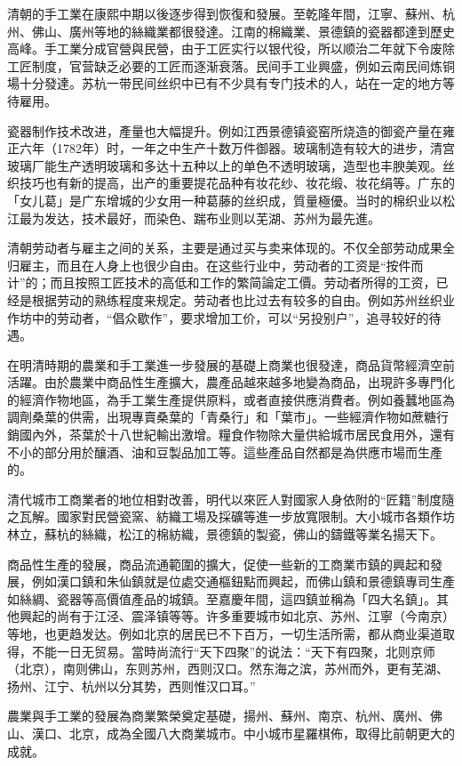 清朝的手工業在康熙中期以後逐步得到恢復和發展。至乾隆年間，江寧、蘇州、杭州、佛山、廣州等地的絲織業都很發達。江南的棉織業、景德鎮的瓷器都達到歷史高峰。手工業分成官營與民營，由于工匠实行以银代役，所以顺治二年就下令废除工匠制度，官营缺乏必要的工匠而逐渐衰落。民间手工业興盛，例如云南民间炼铜場十分發達。苏杭一带民间丝织中已有不少具有专门技术的人，站在一定的地方等待雇用。

瓷器制作技术改进，產量也大幅提升。例如江西景德镇瓷窑所烧造的御瓷产量在雍正六年（1782年）时，一年之中生产十数万件御器。玻璃制造有较大的进步，清宫玻璃厂能生产透明玻璃和多达十五种以上的单色不透明玻璃，造型也丰腴美观。丝织技巧也有新的提高，出产的重要提花品种有妆花纱、妆花缎、妆花绢等。广东的「女儿葛」是广东增城的少女用一种葛藤的丝织成，質量極優。当时的棉织业以松江最为发达，技术最好，而染色、踹布业则以芜湖、苏州为最先進。

清朝劳动者与雇主之间的关系，主要是通过买与卖来体现的。不仅全部劳动成果全归雇主，而且在人身上也很少自由。在这些行业中，劳动者的工资是“按件而计”的；而且按照工匠技术的高低和工作的繁简論定工價。劳动者所得的工资，已经是根据劳动的熟练程度来规定。劳动者也比过去有较多的自由。例如苏州丝织业作坊中的劳动者，“倡众歇作”，要求增加工价，可以“另投别户”，追寻较好的待遇。

在明清時期的農業和手工業進一步發展的基礎上商業也很發達，商品貨幣經濟空前活躍。由於農業中商品性生產擴大，農產品越來越多地變為商品，出現許多專門化的經濟作物地區，為手工業生產提供原料，或者直接供應消費者。例如養蠶地區為調劑桑葉的供需，出現專賣桑葉的「青桑行」和「葉市」。一些經濟作物如蔗糖行銷國內外，茶葉於十八世紀輸出激增。糧食作物除大量供給城市居民食用外，還有不小的部分用於釀酒、油和豆製品加工等。這些產品自然都是為供應市場而生產的。

清代城市工商業者的地位相對改善，明代以來匠人對國家人身依附的“匠籍”制度隨之瓦解。國家對民營瓷窯、紡織工場及採礦等進一步放寬限制。大小城市各類作坊林立，蘇杭的絲織，松江的棉紡織，景德鎮的製瓷，佛山的鑄鐵等業名揚天下。

商品性生產的發展，商品流通範圍的擴大，促使一些新的工商業市鎮的興起和發展，例如漢口鎮和朱仙鎮就是位處交通樞鈕點而興起，而佛山鎮和景德鎮專司生產如絲綢、瓷器等高價值產品的城鎮。至嘉慶年間，這四鎮並稱為「四大名鎮」。其他興起的尚有于江泾、震泽镇等等。许多重要城市如北京、苏州、江寧（今南京）等地，也更趋发达。例如北京的居民已不下百万，一切生活所需，都从商业渠道取得，不能一日无贸易。當時尚流行“天下四聚”的说法：“天下有四聚，北则京师（北京），南则佛山，东则苏州，西则汉口。然东海之滨，苏州而外，更有芜湖、扬州、江宁、杭州以分其势，西则惟汉口耳。”

農業與手工業的發展為商業繁榮奠定基礎，揚州、蘇州、南京、杭州、廣州、佛山、漢口、北京，成為全國八大商業城市。中小城市星羅棋佈，取得比前朝更大的成就。

